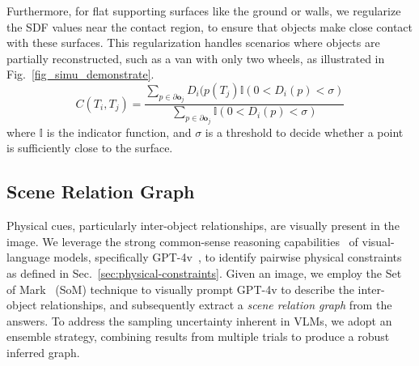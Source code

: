 
Furthermore, for flat supporting surfaces like the ground or walls, we regularize the SDF values near the contact region, to ensure that objects make close contact with these surfaces. This regularization handles scenarios where objects are partially reconstructed, such as a van with only two wheels, as illustrated in Fig.~\ref{fig_simu_demonstrate}.
\begin{equation}
\label{eq:support-constraint3}
    C(T_i,T_j) = \frac{\sum_{p \in \partial \bm{o}_j} D_i(p(T_j) \mathbb{I}(0<D_i(p)<\sigma)}{\sum_{p \in \partial \bm{o}_j} \mathbb{I}(0<D_i(p)<\sigma)}
\end{equation}
where $\mathbb{I}$ is the indicator function, and $\sigma$ is a threshold to decide whether a point is sufficiently close to the surface.



\subsection{Scene Relation Graph}
\label{sec:scene-relation-graph}

Physical cues, particularly inter-object relationships, are visually present in the image.  We leverage the strong common-sense reasoning capabilities~\cite{rana2023sayplan,li2024llm,cheng2024navila} of visual-language models, specifically GPT-4v~\cite{achiam2023gpt}, to identify pairwise physical constraints as defined in Sec.~\ref{sec:physical-constraints}. Given an image, we employ the Set of Mark~\cite{yang2023setofmark} (SoM) technique to visually prompt GPT-4v to describe the inter-object relationships, and subsequently extract a \emph{scene relation graph} from the answers.
To address the sampling uncertainty inherent in VLMs, we adopt an ensemble strategy, combining results from multiple trials to produce a robust inferred graph. 

